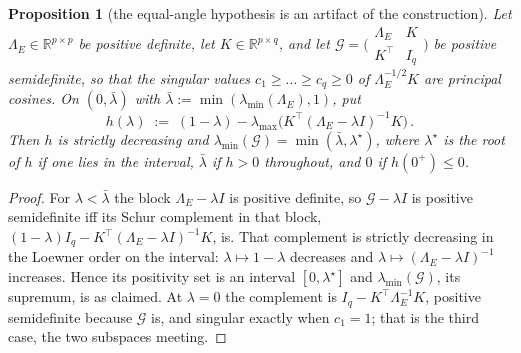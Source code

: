 \documentclass[11pt]{article}
\newtheorem{proposition}[theorem]{Proposition}
\theoremstyle{remark}
\newcommand{\Gr}{\mathcal{G}}
\newcommand{\Le}{\Lambda_E}
\begin{document}
\begin{proposition}[the equal-angle hypothesis is an artifact of the construction]\label{prop:multi}
Let $\Le\in\mathbb R^{p\times p}$ be positive definite, let $K\in\mathbb R^{p\times q}$, and let
$\Gr=\bigl(\begin{smallmatrix}\Le&K\\ K^{\top}&I_q\end{smallmatrix}\bigr)$ be positive semidefinite,
so that the singular values $c_1\ge\ldots\ge c_q\ge0$ of $\Le^{-1/2}K$ are principal cosines. On
$(0,\bar\lambda)$ with $\bar\lambda:=\min(\lambda_{\min}(\Le),1)$, put
\begin{equation}\label{eq:multi}
  h(\lambda)\;:=\;(1-\lambda)-\lambda_{\max}\!\bigl(K^{\top}(\Le-\lambda I)^{-1}K\bigr)\,.
\end{equation}
Then $h$ is
strictly decreasing and $\lambda_{\min}(\Gr)=\min(\bar\lambda,\lambda^{\star})$, where
$\lambda^{\star}$ is the root of $h$ if one lies in the interval, $\bar\lambda$ if $h>0$ throughout,
and $0$ if $h(0^{+})\le0$.
\end{proposition}

\begin{proof}
For $\lambda<\bar\lambda$ the block $\Le-\lambda I$ is positive definite, so $\Gr-\lambda I$ is
positive semidefinite iff its Schur complement in that block,
$(1-\lambda)I_q-K^{\top}(\Le-\lambda I)^{-1}K$, is. That complement is strictly decreasing in the
Loewner order on the interval: $\lambda\mapsto1-\lambda$ decreases and
$\lambda\mapsto(\Le-\lambda I)^{-1}$ increases. Hence its positivity set is an interval
$[0,\lambda^{\star}]$ and $\lambda_{\min}(\Gr)$, its supremum, is as claimed. At $\lambda=0$ the
complement is $I_q-K^{\top}\Le^{-1}K$, positive semidefinite because $\Gr$ is, and singular exactly
when $c_1=1$; that is the third case, the two subspaces meeting.
\end{proof}
\end{document}
